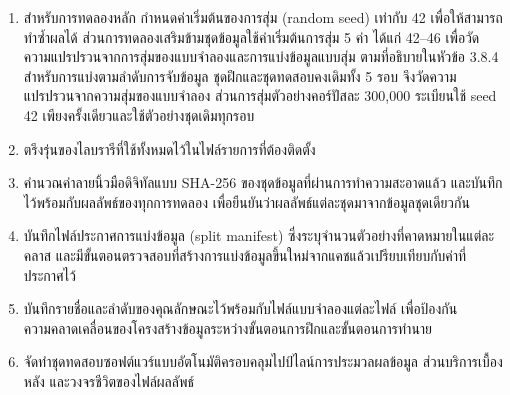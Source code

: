 \begin{enumerate}
    \item สำหรับการทดลองหลัก กำหนดค่าเริ่มต้นของการสุ่ม (random seed) เท่ากับ 42 เพื่อให้สามารถทำซ้ำผลได้ ส่วนการทดลองเสริมข้ามชุดข้อมูลใช้ค่าเริ่มต้นการสุ่ม 5 ค่า ได้แก่ 42--46 เพื่อวัดความแปรปรวนจากการสุ่มของแบบจำลองและการแบ่งข้อมูลแบบสุ่ม ตามที่อธิบายในหัวข้อ 3.8.4 สำหรับการแบ่งตามลำดับการจับข้อมูล ชุดฝึกและชุดทดสอบคงเดิมทั้ง 5 รอบ จึงวัดความแปรปรวนจากความสุ่มของแบบจำลอง ส่วนการสุ่มตัวอย่างคอร์ปัสละ 300,000 ระเบียนใช้ seed 42 เพียงครั้งเดียวและใช้ตัวอย่างชุดเดิมทุกรอบ
    \item ตรึงรุ่นของไลบรารีที่ใช้ทั้งหมดไว้ในไฟล์รายการที่ต้องติดตั้ง
    \item คำนวณค่าลายนิ้วมือดิจิทัลแบบ SHA-256 ของชุดข้อมูลที่ผ่านการทำความสะอาดแล้ว และบันทึกไว้พร้อมกับผลลัพธ์ของทุกการทดลอง เพื่อยืนยันว่าผลลัพธ์แต่ละชุดมาจากข้อมูลชุดเดียวกัน
    \item บันทึกไฟล์ประกาศการแบ่งข้อมูล (split manifest) ซึ่งระบุจำนวนตัวอย่างที่คาดหมายในแต่ละคลาส และมีขั้นตอนตรวจสอบที่สร้างการแบ่งข้อมูลขึ้นใหม่จากแคชแล้วเปรียบเทียบกับค่าที่ประกาศไว้
    \item บันทึกรายชื่อและลำดับของคุณลักษณะไว้พร้อมกับไฟล์แบบจำลองแต่ละไฟล์ เพื่อป้องกันความคลาดเคลื่อนของโครงสร้างข้อมูลระหว่างขั้นตอนการฝึกและขั้นตอนการทำนาย
    \item จัดทำชุดทดสอบซอฟต์แวร์แบบอัตโนมัติครอบคลุมไปป์ไลน์การประมวลผลข้อมูล ส่วนบริการเบื้องหลัง และวงจรชีวิตของไฟล์ผลลัพธ์
\end{enumerate}
